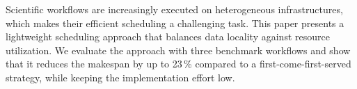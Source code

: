 Scientific workflows are increasingly executed on heterogeneous infrastructures, which makes their efficient scheduling a challenging task.
This paper presents a lightweight scheduling approach that balances data locality against resource utilization.
We evaluate the approach with three benchmark workflows and show that it reduces the makespan by up to 23\,\% compared to a first-come-first-served strategy, while keeping the implementation effort low.

